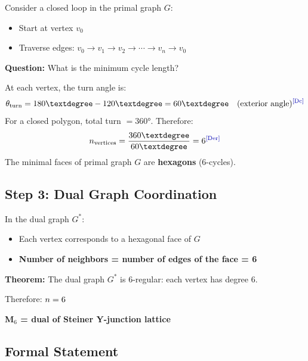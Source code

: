 Consider a closed loop in the primal graph $G$:
\begin{itemize}
    \item Start at vertex $v_0$
    \item Traverse edges: $v_0 \to v_1 \to v_2 \to \cdots \to v_n \to v_0$
\end{itemize}

\textbf{Question:} What is the minimum cycle length?

\begin{derivationbox}[title=Hexagonal Faces from $\Zsix$]
    At each vertex, the turn angle is:
    \begin{equation}
        \theta_{\text{turn}} = 180° - 120° = 60° \quad \text{(exterior angle)} \tagDc
    \end{equation}
    For a closed polygon, total turn $= 360°$. Therefore:
    \begin{equation}
        n_{\text{vertices}} = \frac{360°}{60°} = 6 \tagDer
    \end{equation}
    The minimal faces of primal graph $G$ are \textbf{hexagons} (6-cycles).
\end{derivationbox}

\subsection{Step 3: Dual Graph Coordination}

In the dual graph $G^*$:
\begin{itemize}
    \item Each vertex corresponds to a hexagonal face of $G$
    \item \textbf{Number of neighbors = number of edges of the face = 6}
\end{itemize}

\begin{derivationbox}[title=The M$_6$ Result]
    \textbf{Theorem:} The dual graph $G^*$ is 6-regular: each vertex has degree 6.

    Therefore: $n = 6$ \quad \tagDer

    \textbf{M$_6$ = dual of Steiner Y-junction lattice}
\end{derivationbox}

\subsection{Formal Statement}


